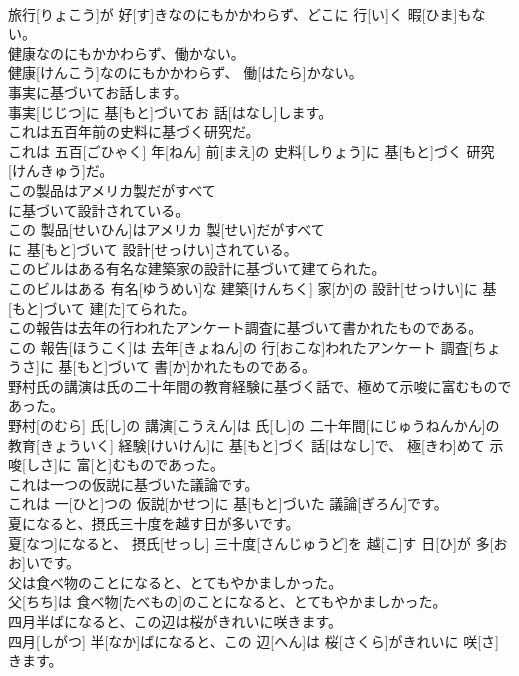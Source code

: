 \documentclass[8pt]{extreport}
\begin{document}
\begin{CJK}{UTF8}{min}
\\	旅行[りょこう]が 好[す]きなのにもかかわらず、どこに 行[い]く 暇[ひま]もない。
\\	健康なのにもかかわらず、働かない。	
\\	健康[けんこう]なのにもかかわらず、 働[はたら]かない。
\\	事実に基づいてお話します。	
\\	事実[じじつ]に 基[もと]づいてお 話[はなし]します。
\\	これは五百年前の史料に基づく研究だ。	
\\	これは 五百[ごひゃく] 年[ねん] 前[まえ]の 史料[しりょう]に 基[もと]づく 研究[けんきゅう]だ。
\\	この製品はアメリカ製だがすべて
\\	に基づいて設計されている。	
\\	この 製品[せいひん]はアメリカ 製[せい]だがすべて 
\\	に 基[もと]づいて 設計[せっけい]されている。
\\	このビルはある有名な建築家の設計に基づいて建てられた。	
\\	このビルはある 有名[ゆうめい]な 建築[けんちく] 家[か]の 設計[せっけい]に 基[もと]づいて 建[た]てられた。
\\	この報告は去年の行われたアンケート調査に基づいて書かれたものである。	
\\	この 報告[ほうこく]は 去年[きょねん]の 行[おこな]われたアンケート 調査[ちょうさ]に 基[もと]づいて 書[か]かれたものである。
\\	野村氏の講演は氏の二十年間の教育経験に基づく話で、極めて示唆に富むものであった。	
\\	野村[のむら] 氏[し]の 講演[こうえん]は 氏[し]の 二十年間[にじゅうねんかん]の 教育[きょういく] 経験[けいけん]に 基[もと]づく 話[はなし]で、 極[きわ]めて 示唆[しさ]に 富[と]むものであった。
\\	これは一つの仮説に基づいた議論です。	
\\	これは 一[ひと]つの 仮説[かせつ]に 基[もと]づいた 議論[ぎろん]です。
\\	夏になると、摂氏三十度を越す日が多いです。	
\\	夏[なつ]になると、 摂氏[せっし] 三十度[さんじゅうど]を 越[こ]す 日[ひ]が 多[おお]いです。
\\	父は食べ物のことになると、とてもやかましかった。	
\\	父[ちち]は 食べ物[たべもの]のことになると、とてもやかましかった。
\\	四月半ばになると、この辺は桜がきれいに咲きます。	
\\	四月[しがつ] 半[なか]ばになると、この 辺[へん]は 桜[さくら]がきれいに 咲[さ]きます。

\end{CJK}
\end{document}
